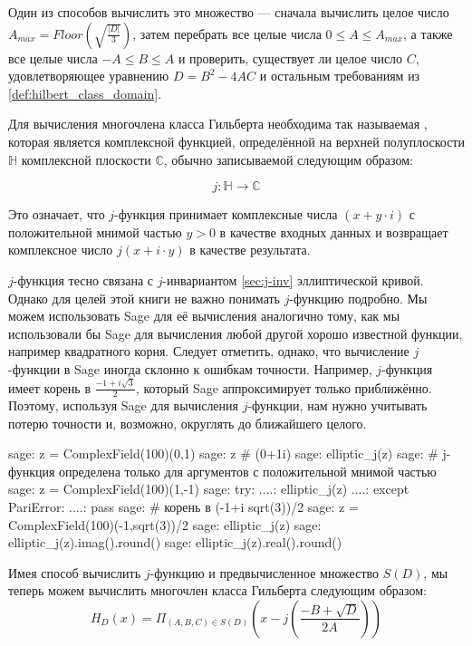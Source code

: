 Один из способов вычислить это множество — сначала вычислить целое число $A_{max}= Floor(\sqrt{\frac{|D|}{3}})$, затем перебрать все целые числа $0\leq A\leq A_{max}$, а также все целые числа $-A\leq B \leq A$ и проверить, существует ли целое число $C$, удовлетворяющее уравнению $D = B^2-4AC$ и остальным требованиям из \ref{def:hilbert_class_domain}.

Для вычисления многочлена класса Гильберта необходима так называемая , которая является комплексной функцией, определённой на верхней полуплоскости $\mathbb{H}$ комплексной плоскости $\mathbb{C}$, обычно записываемой следующим образом:

\begin{equation}\label{eq:j-invariant2}
j: \mathbb{H} \to \mathbb{C}
\end{equation}

Это означает, что $j$-функция принимает комплексные числа $(x +y\cdot i)$ с положительной мнимой частью $y>0$ в качестве входных данных и возвращает комплексное число $j(x+i\cdot y)$ в качестве результата.

$j$-функция тесно связана с $j$-инвариантом \ref{sec:j-inv} эллиптической кривой. Однако для целей этой книги не важно понимать $j$-функцию подробно. Мы можем использовать Sage для её вычисления аналогично тому, как мы использовали бы Sage для вычисления любой другой хорошо известной функции, например квадратного корня. Следует отметить, однако, что вычисление $j$-функции в Sage иногда склонно к ошибкам точности. Например, $j$-функция имеет корень в $\frac{-1+i\sqrt{3}}{2}$, который Sage аппроксимирует только приближённо. Поэтому, используя Sage для вычисления $j$-функции, нам нужно учитывать потерю точности и, возможно, округлять до ближайшего целого.

\begin{sagecommandline}
sage: z = ComplexField(100)(0,1)
sage: z # (0+1i)
sage: elliptic_j(z)
sage: # j-функция определена только для аргументов с положительной мнимой частью
sage: z = ComplexField(100)(1,-1)
sage: try:
....:     elliptic_j(z)
....: except PariError:
....:     pass
sage: # корень в (-1+i sqrt(3))/2
sage: z = ComplexField(100)(-1,sqrt(3))/2
sage: elliptic_j(z)
sage: elliptic_j(z).imag().round()
sage: elliptic_j(z).real().round()
\end{sagecommandline}

Имея способ вычислить $j$-функцию и предвычисленное множество $S(D)$, мы теперь можем вычислить многочлен класса Гильберта следующим образом:
\begin{equation}
H_D(x) = \Pi_{(A,B,C)\in S(D)} \left(x - j\left(\frac{-B + \sqrt{D}}{2A}\right)\right)
\end{equation}

